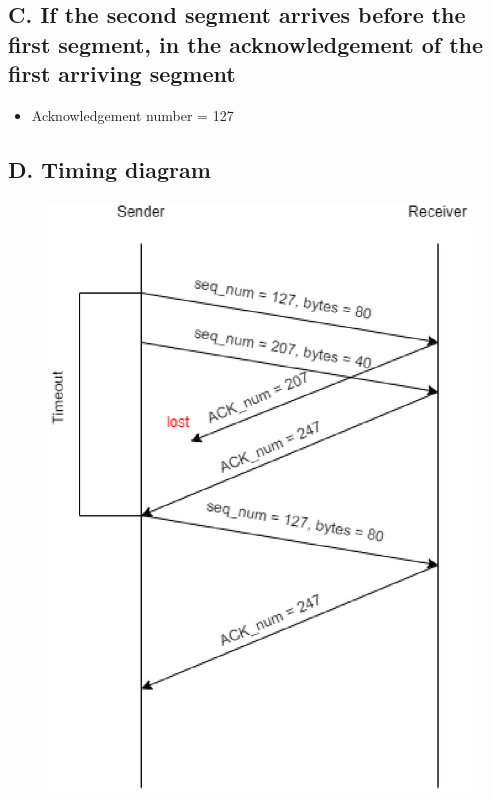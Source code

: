 \documentclass[12pt,a4paper]{article}
\begin{document}
\subsection*{C. If the second segment arrives before the first segment, in the acknowledgement of the first arriving segment}
\begin{itemize}
    \item Acknowledgement number = 127
\end{itemize}

\newpage
\subsection*{D. Timing diagram}
\begin{figure}[h]
    \centering
    \includegraphics[scale=0.5]{P27_d.drawio.eps}
\end{figure}
\end{document}
